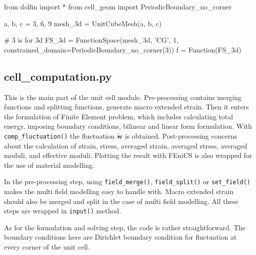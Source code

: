 \documentclass[10pt,a4paper]{scrreprt}
\begin{document}
\begin{python}
from dolfin import *
from cell_geom import PeriodicBoundary_no_corner

a, b, c = 3, 6, 9
mesh_3d = UnitCubeMesh(a, b, c)

# 3 is for 3d
FS_3d = FunctionSpace(mesh_3d, 'CG', 1, constrained_domain=PeriodicBoundary_no_corner(3))
f = Function(FS_3d)
\end{python}

\subsection{cell\_computation.py}
This is the main part of the unit cell module. Pre-processing contains merging functions and splitting functions, generate macro extended strain. Then it enters the formulation of Finite Element problem, which includes calculating total energy, imposing boundary conditions, bilinear and linear form formulation. With \texttt{comp\_fluctuation()} the fluctuation $\widetilde{\mathbf{w}}$ is obtained. Post-processing concerns about the calculation of strain, stress, averaged strain, averaged stress, averaged moduli, and effective moduli. Plotting the result with FEniCS is also wrapped for the use of material modelling.

In the pre-processing step, using \texttt{field\_merge()}, \texttt{field\_split()} or \texttt{set\_field()} makes the multi field modelling easy to handle with. Macro extended strain should also be merged and split in the case of multi field modelling. All these steps are wrapped in \texttt{input()} method.

As for the formulation and solving step, the code is rather straightforward. The boundary conditions here are Dirichlet boundary condition for fluctuation at every corner of the unit cell.
\end{document}
